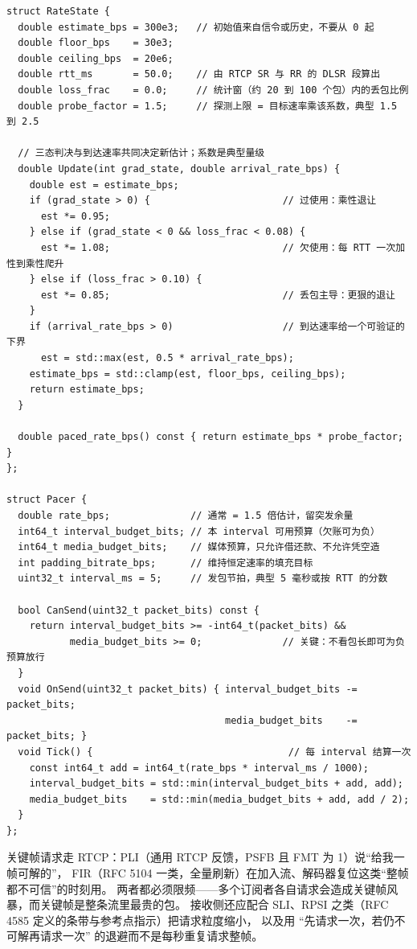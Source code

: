 \documentclass[12pt,a4paper,fontset=fandol]{ctexbook}
\begin{document}
\begin{lstlisting}[style=cppstyle,caption={估计融合、AIMD 与 pacer 队列的最小骨架},label={lst:ch14-aimd-pacer}]
struct RateState {
  double estimate_bps = 300e3;   // 初始值来自信令或历史，不要从 0 起
  double floor_bps    = 30e3;
  double ceiling_bps  = 20e6;
  double rtt_ms       = 50.0;    // 由 RTCP SR 与 RR 的 DLSR 段算出
  double loss_frac    = 0.0;     // 统计窗（约 20 到 100 个包）内的丢包比例
  double probe_factor = 1.5;     // 探测上限 = 目标速率乘该系数，典型 1.5 到 2.5

  // 三态判决与到达速率共同决定新估计；系数是典型量级
  double Update(int grad_state, double arrival_rate_bps) {
    double est = estimate_bps;
    if (grad_state > 0) {                       // 过使用：乘性退让
      est *= 0.95;
    } else if (grad_state < 0 && loss_frac < 0.08) {
      est *= 1.08;                              // 欠使用：每 RTT 一次加性到乘性爬升
    } else if (loss_frac > 0.10) {
      est *= 0.85;                              // 丢包主导：更狠的退让
    }
    if (arrival_rate_bps > 0)                   // 到达速率给一个可验证的下界
      est = std::max(est, 0.5 * arrival_rate_bps);
    estimate_bps = std::clamp(est, floor_bps, ceiling_bps);
    return estimate_bps;
  }

  double paced_rate_bps() const { return estimate_bps * probe_factor; }
};

struct Pacer {
  double rate_bps;              // 通常 = 1.5 倍估计，留突发余量
  int64_t interval_budget_bits; // 本 interval 可用预算（欠账可为负）
  int64_t media_budget_bits;    // 媒体预算，只允许借还款、不允许凭空造
  int padding_bitrate_bps;      // 维持恒定速率的填充目标
  uint32_t interval_ms = 5;     // 发包节拍，典型 5 毫秒或按 RTT 的分数

  bool CanSend(uint32_t packet_bits) const {
    return interval_budget_bits >= -int64_t(packet_bits) &&
           media_budget_bits >= 0;              // 关键：不看包长即可为负预算放行
  }
  void OnSend(uint32_t packet_bits) { interval_budget_bits -= packet_bits;
                                      media_budget_bits    -= packet_bits; }
  void Tick() {                                  // 每 interval 结算一次
    const int64_t add = int64_t(rate_bps * interval_ms / 1000);
    interval_budget_bits = std::min(interval_budget_bits + add, add);
    media_budget_bits    = std::min(media_budget_bits + add, add / 2);
  }
};
\end{lstlisting}

关键帧请求走 RTCP：PLI（通用 RTCP 反馈，PSFB 且 FMT 为 1）说``给我一帧可解的''，
FIR（RFC 5104 一类，全量刷新）在加入流、解码器复位这类``整帧都不可信''的时刻用。
两者都必须限频——多个订阅者各自请求会造成关键帧风暴，而关键帧是整条流里最贵的包。
接收侧还应配合 SLI、RPSI 之类（RFC 4585 定义的条带与参考点指示）把请求粒度缩小，
以及用 ``先请求一次，若仍不可解再请求一次'' 的退避而不是每秒重复请求整帧。
\end{document}
